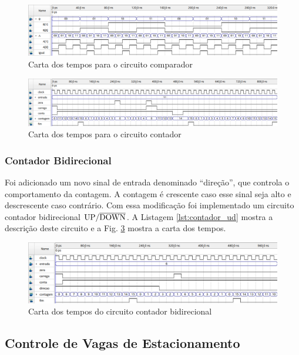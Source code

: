 \documentclass[a4,12pt]{horizon-theme}
\begin{document}
\begin{figure}[!ht]
  \centering
  \includegraphics[width=\textwidth]{comparador.png}
  \caption{Carta dos tempos para o circuito comparador}
  \label{fig:ct_comparador}
\end{figure}


\begin{figure}[!ht]
  \centering
  \includegraphics[width=\textwidth]{contador.png}
  \caption{Carta dos tempos para o circuito contador}
  \label{fig:ct_contador}
\end{figure}


\subsubsection{Contador Bidirecional}
\label{sec:plan_1_ud}
Foi adicionado um novo sinal de entrada denominado ``direção'', que controla o comportamento da contagem. A contagem é crescente caso esse sinal seja alto e descrescente caso contrário. Com essa modificação foi implementado um circuito contador bidirecional $\textrm{UP/}\overline{\textrm{DOWN}}$. A Listagem \ref{lst:contador_ud} mostra a descrição deste circuito e a Fig. \ref{fig:ct_contador_ud} mostra a carta dos tempos.

\begin{figure}[!ht]
  \centering
  \includegraphics[width=\textwidth]{contador_ud.png}
  \caption{Carta dos tempos do circuito contador bidirecional}
  \label{fig:ct_contador_ud}
\end{figure}

\newpage
\subsection{Controle de Vagas de Estacionamento}
\end{document}
